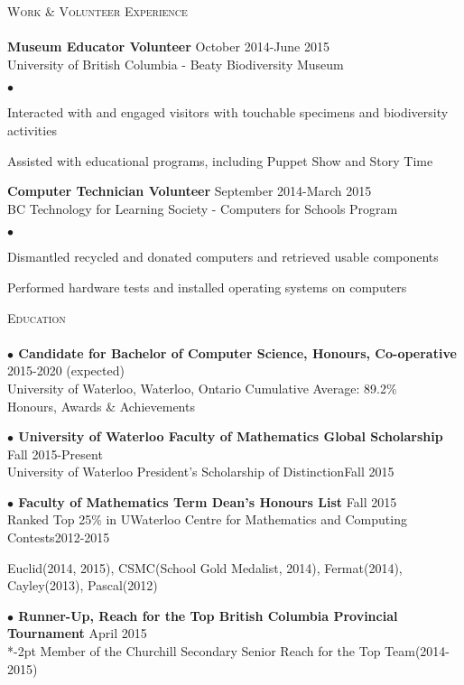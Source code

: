 \documentclass{article}
\newcommand{\lineunder}{\vspace*{-8pt} \\ \hspace*{-18pt} \hrulefill \\}
\newcommand{\header}[1]{{\hspace*{-15pt}\vspace*{6pt} \textsc{#1}} \vspace*{-6pt} \lineunder}
\newcommand{\employer}[3]{{ \textbf{#1} \hfill #2\\ {#3}\\  }}
\newenvironment{achievements}{\begin{list}{$\bullet$}{\topsep 0pt \itemsep -2pt}}{\vspace*{4pt}\end{list}}
\newcommand{\schoolwithcourses}[4]{
 \textbf{$\bullet$ \hspace{2bp}#1} \hfill{#2}\\ \hspace{6mm}#3\\ 
\vspace*{5pt}
}
\newcommand{\award}[3]{\textbf{$\bullet$ \hspace{2bp}#1} \hfill{#2} \\ \vspace{2pt}
}
\begin{document}
\header{Work \& Volunteer Experience}
\employer{Museum Educator Volunteer}{October 2014-June 2015}{University of British Columbia - Beaty Biodiversity Museum}
	\begin{achievements}
	\item Interacted with and engaged visitors with touchable specimens and biodiversity activities
	\item Assisted with educational programs, including Puppet Show and Story Time 
	\end{achievements}

\employer{Computer Technician Volunteer}{September 2014-March 2015}{BC Technology for Learning Society - Computers for Schools Program}
	\begin{achievements}
	\item Dismantled recycled and donated computers and retrieved usable components
	\item Performed hardware tests and installed operating systems on computers
	\end{achievements}

\header{Education}

\schoolwithcourses{Candidate for Bachelor of Computer Science, Honours, Co-operative}{2015-2020 (expected)}{University of Waterloo, Waterloo, Ontario \hspace{27pt} Cumulative Average: 89.2\%}


\header{Honours, Awards \& Achievements}

\award {University of Waterloo Faculty of Mathematics Global Scholarship}{Fall 2015-Present}

\award{University of Waterloo President's Scholarship of Distinction}{Fall 2015}

\award{Faculty of Mathematics Term Dean's Honours List}{Fall 2015}

\award{Ranked Top 25\% in UWaterloo Centre for Mathematics and Computing Contests}{2012-2015}

\vspace{-2pt}
\hspace{8bp}
Euclid(2014, 2015), CSMC(School Gold Medalist, 2014), Fermat(2014), Cayley(2013), Pascal(2012)

\award{Runner-Up, Reach for the Top British Columbia Provincial Tournament}{April 2015}

\vspace*{-2pt}
\hspace{8bp}
Member of the Churchill Secondary Senior Reach for the Top Team(2014-2015)
\end{document}
